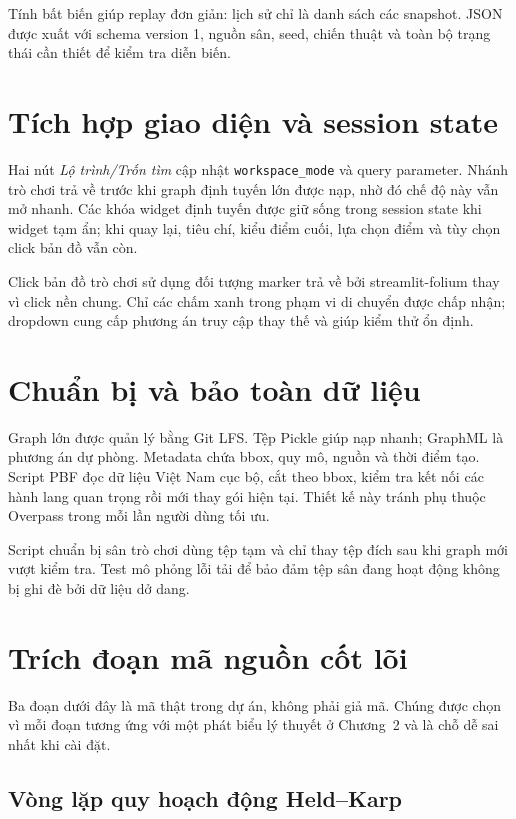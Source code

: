 Tính bất biến giúp replay đơn giản: lịch sử chỉ là danh sách các snapshot. JSON
được xuất với schema version 1, nguồn sân, seed, chiến thuật và toàn bộ trạng
thái cần thiết để kiểm tra diễn biến.

\section{Tích hợp giao diện và session state}

Hai nút \textit{Lộ trình/Trốn tìm} cập nhật \texttt{workspace\_mode} và query
parameter. Nhánh trò chơi trả về trước khi graph định tuyến lớn được nạp, nhờ đó
chế độ này vẫn mở nhanh. Các khóa widget định tuyến được giữ sống trong session
state khi widget tạm ẩn; khi quay lại, tiêu chí, kiểu điểm cuối, lựa chọn điểm và
tùy chọn click bản đồ vẫn còn.

Click bản đồ trò chơi sử dụng đối tượng marker trả về bởi streamlit-folium thay
vì click nền chung. Chỉ các chấm xanh trong phạm vi di chuyển được chấp nhận;
dropdown cung cấp phương án truy cập thay thế và giúp kiểm thử ổn định.

\section{Chuẩn bị và bảo toàn dữ liệu}
\enlargethispage{5\baselineskip}

Graph lớn được quản lý bằng Git LFS. Tệp Pickle giúp nạp nhanh; GraphML là phương
án dự phòng. Metadata chứa bbox, quy mô, nguồn và thời điểm tạo. Script PBF đọc
dữ liệu Việt Nam cục bộ, cắt theo bbox, kiểm tra kết nối các hành lang quan trọng
rồi mới thay gói hiện tại. Thiết kế này tránh phụ thuộc Overpass trong mỗi lần
người dùng tối ưu.

Script chuẩn bị sân trò chơi dùng tệp tạm và chỉ thay tệp đích sau khi graph mới
vượt kiểm tra. Test mô phỏng lỗi tải để bảo đảm tệp sân đang hoạt động không bị
ghi đè bởi dữ liệu dở dang.

\section{Trích đoạn mã nguồn cốt lõi}
\label{sec:trich-doan-ma}

Ba đoạn dưới đây là mã thật trong dự án, không phải giả mã. Chúng được chọn vì mỗi
đoạn tương ứng với một phát biểu lý thuyết ở Chương~2 và là chỗ dễ sai nhất khi
cài đặt.

\subsection{Vòng lặp quy hoạch động Held--Karp}

